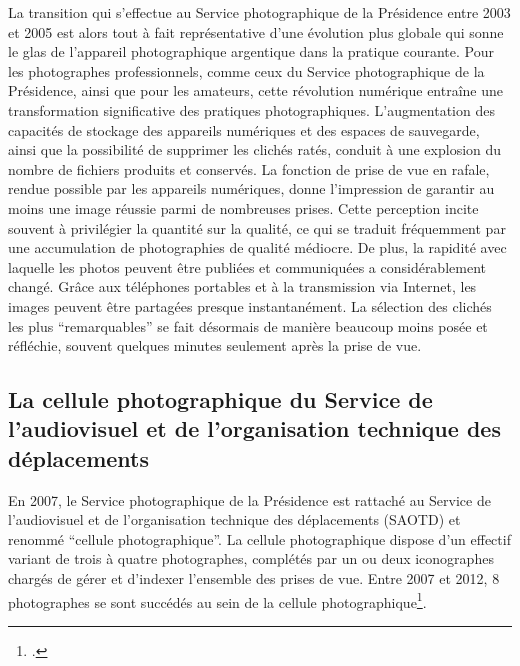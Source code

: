 La transition qui s'effectue au Service photographique de la Présidence entre 2003 et 2005 est alors tout à fait représentative d'une évolution plus globale qui sonne le glas de l'appareil photographique argentique dans la pratique courante. Pour les photographes professionnels, comme ceux du Service photographique de la Présidence, ainsi que pour les amateurs, cette révolution numérique entraîne une transformation significative des pratiques photographiques. L'augmentation des capacités de stockage des appareils numériques et des espaces de sauvegarde, ainsi que la possibilité de supprimer les clichés ratés, conduit à une explosion du nombre de fichiers produits et conservés. La fonction de prise de vue en rafale, rendue possible par les appareils numériques, donne l'impression de garantir au moins une image réussie parmi de nombreuses prises. Cette perception incite souvent à privilégier la quantité sur la qualité, ce qui se traduit fréquemment par une accumulation de photographies de qualité médiocre. De plus, la rapidité avec laquelle les photos peuvent être publiées et communiquées a considérablement changé. Grâce aux téléphones portables et à la transmission via Internet, les images peuvent être partagées presque instantanément. La sélection des clichés les plus \enquote{remarquables} se fait désormais de manière beaucoup moins posée et réfléchie, souvent quelques minutes seulement après la prise de vue.

\subsection*{La cellule photographique du Service de l'audiovisuel et de l'organisation technique des déplacements}

En 2007, le Service photographique de la Présidence est rattaché au Service de l'audiovisuel et de l'organisation technique des déplacements (SAOTD) et renommé \enquote{cellule photographique}. La cellule photographique dispose d'un effectif variant de trois à quatre photographes, complétés par un ou deux iconographes chargés de gérer et d'indexer l'ensemble des prises de vue. Entre 2007 et 2012, 8 photographes se sont succédés au sein de la cellule photographique\footcite{archivesnationalesFrancePresidenceRepublique}. 

